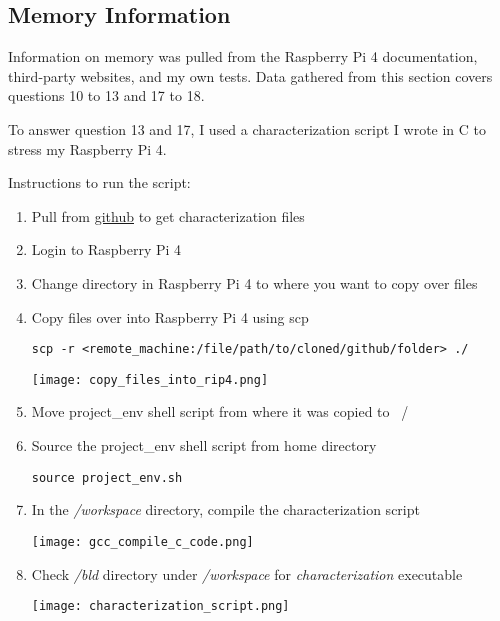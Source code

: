 \documentclass[journal]{IEEEtran}
\begin{document}
    \subsection{Memory Information}
    Information on memory was pulled from the Raspberry Pi 4 documentation, third-party websites, and my own tests.
    Data gathered from this section covers questions 10 to 13 and 17 to 18.

    To answer question 13 and 17, I used a characterization script I wrote in C to stress my Raspberry Pi 4.

    Instructions to run the script:
    \begin{enumerate}
      \item Pull from {\href{https://github.com/enriquea02/uw/tree/main/eep522a_embedded_and_real-time_systems/submissions/workspace}{github}} to get characterization files
      \item Login to Raspberry Pi 4
      \item Change directory in Raspberry Pi 4 to where you want to copy over files
      \item Copy files over into Raspberry Pi 4 using scp 
      
      \begin{lstlisting}[frame=single]
        scp -r <remote_machine:/file/path/to/cloned/github/folder> ./
      \end{lstlisting}

      \texttt{[image: copy\_files\_into\_rip4.png]}

      \item Move project_env shell script from where it was copied to ~/
      \item Source the project_env shell script from home directory
      
      \begin{lstlisting}[frame=single]
        source project_env.sh
      \end{lstlisting}

      \item In the \emph{/workspace} directory, compile the characterization script
      
      \texttt{[image: gcc\_compile\_c\_code.png]}

      \item Check \emph{/bld} directory under \emph{/workspace} for \emph{characterization} executable
      
      \texttt{[image: characterization\_script.png]}
      
    \end{enumerate}
\end{document}
